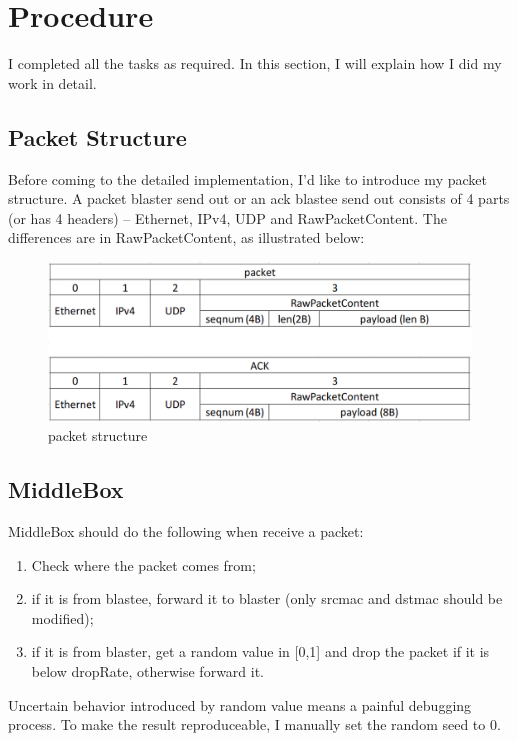 \documentclass[12pt,a4paper,UTF8]{article}
\begin{document}
\section{Procedure}
I completed all the tasks as required.
In this section, I will explain how I did my work in detail.

\subsection{Packet Structure}
Before coming to the detailed implementation, I'd like to introduce my packet structure. A packet blaster send out or an ack blastee send out consists of 4 parts (or has 4 headers) -- Ethernet, IPv4, UDP and RawPacketContent. The differences are in RawPacketContent, as illustrated below:
\begin{figure}[htbp]
	\centering
	\includegraphics[width=\textwidth]{1}
	\caption{packet structure}
\end{figure}

\subsection{MiddleBox}
MiddleBox should do the following when receive a packet:
\begin{enumerate}
	\item Check where the packet comes from;
	\item if it is from blastee, forward it to blaster (only srcmac and dstmac should be modified);
	\item if it is from blaster, get a random value in [0,1] and drop the packet if it is below dropRate, otherwise forward it.
\end{enumerate}
Uncertain behavior introduced by random value means a painful debugging process. To make the result reproduceable, I manually set the random seed to 0.

\end{document}
